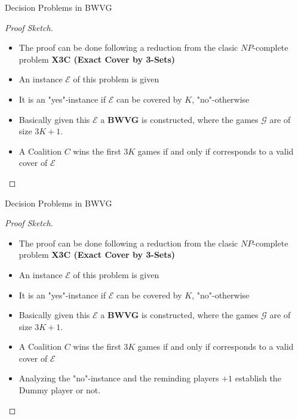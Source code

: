 \documentclass{beamer}
\begin{document}
\begin{frame}[fragile]{Decision Problems in BWVG}
  \begin{proof}[Proof Sketch]
    \begin{itemize}
      \item The proof can be done following a reduction from the clasic $NP$-complete problem \textbf{X3C (Exact Cover by 3-Sets)}
      \item An instance $\mathcal{E}$ of this problem is given
      \item It is an "yes"-instance if $\mathcal{E}$ can be covered by $K$, "no"-otherwise
      \item Basically given this $\mathcal{E}$ a \textbf{BWVG} is constructed, where the games $\mathcal{G}$ are of size $3K+1$.
      \item A Coalition $C$ wins the first $3K$ games if and only if corresponds to a valid cover of $\mathcal{E}$
    \end{itemize}
  \end{proof}
\end{frame}

\begin{frame}[fragile]{Decision Problems in BWVG}
  \begin{proof}[Proof Sketch]
    \begin{itemize}
      \item The proof can be done following a reduction from the clasic $NP$-complete problem \textbf{X3C (Exact Cover by 3-Sets)}
      \item An instance $\mathcal{E}$ of this problem is given
      \item It is an "yes"-instance if $\mathcal{E}$ can be covered by $K$, "no"-otherwise
      \item Basically given this $\mathcal{E}$ a \textbf{BWVG} is constructed, where the games $\mathcal{G}$ are of size $3K+1$.
      \item A Coalition $C$ wins the first $3K$ games if and only if corresponds to a valid cover of $\mathcal{E}$
      \item Analyzing the "no"-instance and the reminding players $+1$ establish the Dummy player or not. 
    \end{itemize}
  \end{proof}
\end{frame}
\end{document}
